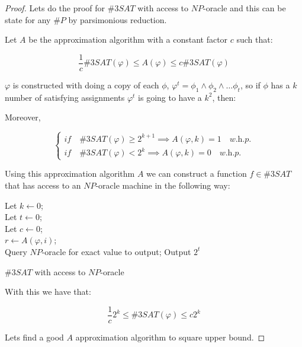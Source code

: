 \documentclass[12pt, a4paper]{article}
\begin{document}
\begin{proof}
  Lets do the proof for $\#3SAT$ with access to $NP$-oracle and this can be state for any $\#P$ by parsimonious reduction.

  Let $A$ be the approximation algorithm with a constant factor $c$ such that:

  \begin{equation}
    \frac{1}{c}\#3SAT(\varphi) \leq A(\varphi) \leq c\#3SAT(\varphi)
  \end{equation}

  $\varphi$ is constructed with doing a copy of each $\phi$, $\varphi^t = \phi_1 \land \phi_2 \land \dots \phi_t$, so if $\phi$ has a $k$ number of satisfying assignments $\varphi^t$ is going to have a $k^2$, then:

Moreover,

$$
\begin{cases}
  \textit{if} \quad \#3SAT(\varphi) \geq 2^{k+1} \implies A(\varphi,k) = 1 \quad \textit{w.h.p.}\\
  \textit{if} \quad \#3SAT(\varphi) < 2^k \implies A(\varphi,k) = 0 \quad \textit{w.h.p.}
\end{cases}
$$

Using this approximation algorithm $A$ we can construct a function $f \in \#3SAT$ that has access to an $NP$-oracle machine in the following way:

\begin{algorithm}[H]
  \Input{$\varphi$}
  Let $k \leftarrow 0$;\\
  Let $t \leftarrow 0$;\\
  Let $c \leftarrow 0$;\\
  {$r \leftarrow A(\varphi, i)$;\\
  }
  {Query $NP$-oracle for exact value to output;
  }{Output $2^t$}
 \caption{$\#3SAT$ with access to $NP$-oracle}
\end{algorithm}

With this we have that:

\begin{equation}
  \frac{1}{c}2^k \leq \#3SAT(\varphi) \leq c2^{k}
\end{equation}

Lets find a good $A$ approximation algorithm to square upper bound.


\end{proof}
\end{document}

